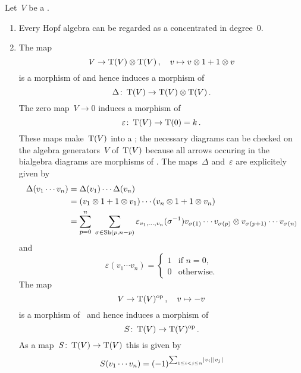 \documentclass[a4paper,10pt,headings=standardclasses]{scrartcl}
\begin{document}
\begin{example}
  \label{examples for dgh}
  Let~$V$ be a {\dgv}.
  \begin{enumerate}
    \item
      Every Hopf algebra can be regarded as a {\dgh} concentrated in degree~$0$.
    \item
      The map
      \[
        V
        \to
        \operatorname{T}(V) \otimes \operatorname{T}(V) \,,
        \quad
        v
        \mapsto
        v \otimes 1 + 1 \otimes v
      \]
      is a morphism of {\dgvs} and hence induces a morphism of~{\dgas}
      \[
        \Delta
        \colon
        \operatorname{T}(V)
        \to
        \operatorname{T}(V) \otimes \operatorname{T}(V) \,.
      \]
      The zero map~$V \to 0$ induces a morphism of~{\dgas}
      \[
        \varepsilon
        \colon
        \operatorname{T}(V)
        \to
        \operatorname{T}(0)
        =
        k \,.
      \]
      These maps make~$\operatorname{T}(V)$ into a {\dgb};
      the necessary diagrams can be checked on the algebra generators~$V$ of~$\operatorname{T}(V)$ because all arrows occuring in the bialgebra diagrams are morphisms of {\dgas}.
      The maps~$\Delta$ and~$\varepsilon$ are explicitely given by
      \begin{align*}
        \Delta(v_1 \dotsm v_n)
        &=
        \Delta(v_1) \dotsm \Delta(v_n)
        \\
        &=
        (v_1 \otimes 1 + 1 \otimes v_1)
        \dotsm
        (v_n \otimes 1 + 1 \otimes v_n)
        \\
        &=
        \sum_{p=0}^n
        \;
        \sum_{\sigma \in \operatorname{Sh}(p,n-p)}
        \varepsilon_{v_1, \dotsc, v_n}(\sigma^{-1})
        v_{\sigma(1)} \dotsm v_{\sigma(p)}
        \otimes
        v_{\sigma(p+1)} \dotsm v_{\sigma(n)}
      \end{align*}
      and
      \[
        \varepsilon( v_1 \dotsm v_n )
        =
        \begin{cases}
          1 & \text{if~$n = 0$}, \\
          0 & \text{otherwise}.
        \end{cases}
      \]
      The map
      \[
        V
        \to
        \operatorname{T}(V)^{\mathrm{op}} \,,
        \quad
        v
        \mapsto
        -v
      \]
      is a morphism of~{\dgvs} and hence induces a morphism of {\dgas}
      \[
        S
        \colon
        \operatorname{T}(V)
        \to
        \operatorname{T}(V)^{\mathrm{op}} \,.
      \]
      As a map~$S \colon \operatorname{T}(V) \to \operatorname{T}(V)$ this is given by
      \[
        S(v_1 \dotsm v_n)
        =
        (-1)^{\sum_{1 \leq i < j \leq n} \lvert v_i\rvert \lvert v_j\rvert}
\]
\end{enumerate}
\end{example}
\end{document}
